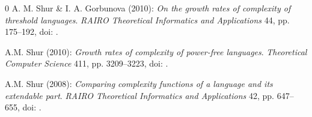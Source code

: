 \documentclass[submission,copyright]{eptcs}\providecommand{\event}{WORDS 2011}
\begin{document}
\begin {thebibliography} {0}
A. M. Shur \& I. A. Gorbunova (2010): {\it On the growth rates of complexity of threshold languages}. {\slshape RAIRO Theoretical Informatics and Applications} 44, pp. 175--192, doi: .

A.M. Shur (2010): {\it Growth rates of complexity of power-free languages}. {\slshape Theoretical Computer Science} 411, pp. 3209--3223, doi: .

A.M. Shur (2008): {\it Comparing complexity functions of a language and its extendable part}. {\slshape RAIRO Theore\-tical Informatics and Applications } 42, pp. 647--655, doi: .
\end {thebibliography}
\end{document}
